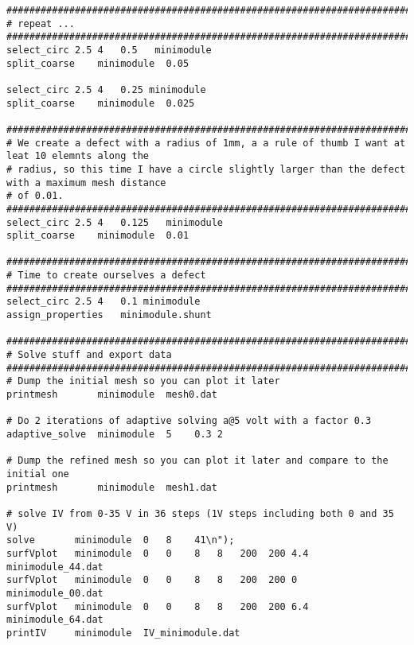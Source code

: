 \documentclass[noshowpacs,preprintnumbers,amsmath,amssymb, letter]{revtex4}
\begin{document}
\begin{small}
\begin{verbatim}
###################################################################################################
# repeat ...
###################################################################################################
select_circ 2.5 4   0.5   minimodule
split_coarse    minimodule  0.05

select_circ 2.5 4   0.25 minimodule
split_coarse    minimodule  0.025

###################################################################################################
# We create a defect with a radius of 1mm, a a rule of thumb I want at leat 10 elemnts along the 
# radius, so this time I have a circle slightly larger than the defect with a maximum mesh distance 
# of 0.01.
###################################################################################################
select_circ 2.5 4   0.125   minimodule
split_coarse    minimodule  0.01

###################################################################################################
# Time to create ourselves a defect
###################################################################################################
select_circ 2.5 4   0.1 minimodule
assign_properties   minimodule.shunt

###################################################################################################
# Solve stuff and export data
###################################################################################################
# Dump the initial mesh so you can plot it later
printmesh       minimodule  mesh0.dat

# Do 2 iterations of adaptive solving a@5 volt with a factor 0.3
adaptive_solve  minimodule  5    0.3 2

# Dump the refined mesh so you can plot it later and compare to the initial one
printmesh       minimodule  mesh1.dat

# solve IV from 0-35 V in 36 steps (1V steps including both 0 and 35 V)
solve       minimodule  0   8    41\n");
surfVplot   minimodule  0   0    8   8   200  200 4.4  minimodule_44.dat
surfVplot   minimodule  0   0    8   8   200  200 0    minimodule_00.dat
surfVplot   minimodule  0   0    8   8   200  200 6.4  minimodule_64.dat
printIV     minimodule  IV_minimodule.dat
\end{verbatim}
\end{small}
\end{document}
